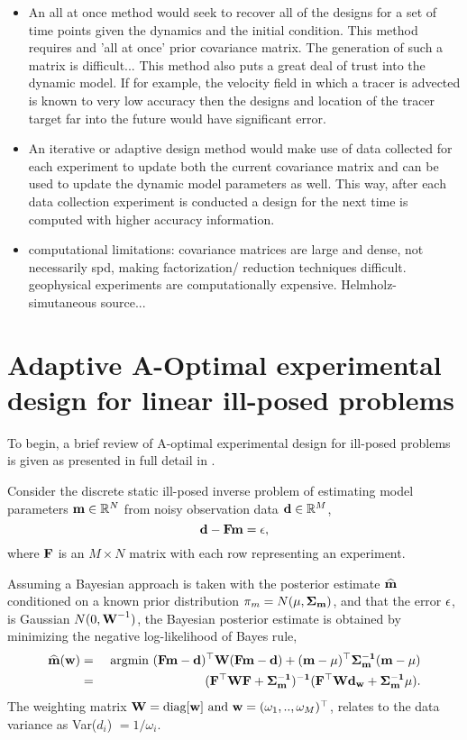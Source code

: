 \documentclass[12pt]{article}
\newcommand {\bfd}   { {\bf d} }
\newcommand {\bfw}   { {\bf w} }
\newcommand {\bfm}   { {\bf m} }
\newcommand {\bfF}  { {\bf F} }
\newcommand{\W}{\text{\bf W}}
\newcommand{\mhat}{\widehat{\bf m}}
\newcommand{\Sig}{\bf \Sigma_m }
\begin{document}
\begin{itemize}
\item An all at once method would seek to recover all of the designs for a set of time points given the dynamics and the initial condition. This method requires and 'all at once' prior covariance matrix. The generation of such a matrix is difficult... This method also puts a great deal of trust into the dynamic model. If for example, the velocity field in which a tracer is advected is known to very low accuracy then the designs and location of the tracer target far into the future would have significant error. 
\item An iterative or adaptive design method would make use of data collected for each experiment to update both the current covariance matrix and can be used to update the dynamic model parameters as well. This way, after each data collection experiment is conducted a design for the next time is computed with higher accuracy information.
\item computational limitations: covariance matrices are large and dense, not necessarily spd, making factorization/ reduction techniques difficult. geophysical experiments are computationally expensive. Helmholz- simutaneous source...

\end{itemize}




\section{Adaptive A-Optimal experimental design for linear ill-posed problems} 
To begin, a brief review of A-optimal experimental design for ill-posed problems is given as presented in full detail in \cite{habera}. 

\bigskip

Consider the discrete static ill-posed inverse problem of estimating  model parameters $\bfm \in \mathbb{R}^{N}$ from noisy observation data $\bfd \in \mathbb{R}^{M}$,
\begin{equation*}
\bfd - \bfF \bfm = {\bf \epsilon},
\end{equation*} 
where $\bfF$ is an $M \times N$ matrix with each row representing an experiment. 
 
Assuming a Bayesian approach is taken with the posterior estimate  $\mhat$ conditioned on a known prior distribution $\pi_m = N({\bf \mu},\Sig)$, and that the error ${\bf \epsilon}$, is Gaussian $N(0,\W^{-1})$, the Bayesian posterior estimate is obtained by minimizing the negative log-likelihood of Bayes rule,
\begin{eqnarray*}
\mhat(\bfw) &=& \text{ argmin } (\bfF \bfm- \bfd)^{\top} \W(\bfF \bfm- \bfd) + (\bfm-{\bf \mu})^{\top}\Sig^{-1}(\bfm-{\bf \mu})\\
 &=& (\bfF^{\top} \W \bfF + \Sig^{-1})^{-1}(\bfF^{\top} \W \bfd_w + \Sig^{-1}{\bf \mu}).
\end{eqnarray*}     
 The weighting matrix $\W = \text{diag}[\bfw] \text{ and } \bfw = (\omega_1,..,\omega_M)^{\top}$, relates to the data variance as Var($d_{i}$) $=1/\omega_i$. 
\bigskip
\end{document}

